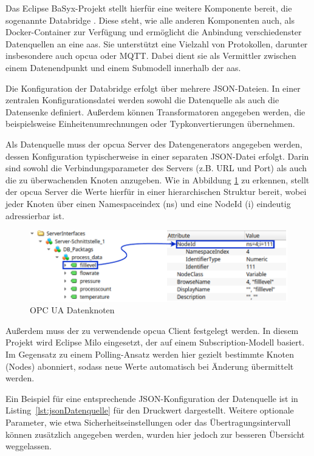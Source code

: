 Das Eclipse BaSyx-Projekt stellt hierfür eine weitere Komponente bereit, die sogenannte Databridge \cite{BaSyxDatabridge}.
Diese steht, wie alle anderen Komponenten auch, als Docker-Container zur Verfügung und ermöglicht die Anbindung verschiedenster Datenquellen an eine \acs{aas}.
Sie unterstützt eine Vielzahl von Protokollen, darunter insbesondere auch \acs{opcua} oder MQTT.
Dabei dient sie als Vermittler zwischen einem Datenendpunkt und einem Submodell innerhalb der \acs{aas}.

Die Konfiguration der Databridge erfolgt über mehrere JSON-Dateien.
In einer zentralen Konfigurationsdatei werden sowohl die Datenquelle als auch die Datensenke definiert.
Außerdem können Transformatoren angegeben werden, die beispielsweise Einheitenumrechnungen oder Typkonvertierungen übernehmen.

Als Datenquelle muss der \acs{opcua} Server des Datengenerators angegeben werden, dessen Konfiguration typischerweise in einer separaten JSON-Datei erfolgt.
Darin sind sowohl die Verbindungsparameter des Servers (z.B. URL und Port) als auch die zu überwachenden Knoten anzugeben.
Wie in Abbildung \ref{fig:OPCUADatenStruktur} zu erkennen, stellt der \acs{opcua} Server die Werte hierfür in einer hierarchischen Struktur bereit, wobei jeder Knoten über einen Namespaceindex (ns) und eine NodeId (i) eindeutig adressierbar ist.

\begin{figure}[htbp]
    \centering
    \includegraphics[width=1\textwidth]{Bilder/OPCUA/OPCUADaten.pdf}
    \caption{OPC UA Datenknoten}
    \label{fig:OPCUADatenStruktur}
\end{figure}

Außerdem muss der zu verwendende \acs{opcua} Client festgelegt werden.
In diesem Projekt wird Eclipse Milo eingesetzt, der auf einem Subscription-Modell basiert.
Im Gegensatz zu einem Polling-Ansatz werden hier gezielt bestimmte Knoten (Nodes) abonniert, sodass neue Werte automatisch bei Änderung übermittelt werden.

Ein Beispiel für eine entsprechende JSON-Konfiguration der Datenquelle ist in Listing~\ref{lst:jsonDatenquelle} für den Druckwert dargestellt.
Weitere optionale Parameter, wie etwa Sicherheitseinstellungen oder das Übertragungsintervall können zusätzlich angegeben werden, wurden hier jedoch zur besseren Übersicht weggelassen.


